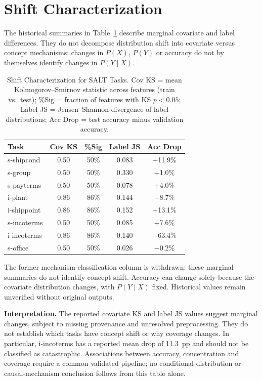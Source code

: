 \documentclass[accepted]{uai2026} %
\begin{document}
\section{Shift Characterization}\label{app:shift_characterization}

The historical summaries in Table~\ref{tab:shift_characterization} describe marginal covariate and label differences. They do not decompose distribution shift into covariate versus concept mechanisms: changes in $P(X)$, $P(Y)$ or accuracy do not by themselves identify changes in $P(Y\mid X)$.

\begin{table}[htbp]
\centering
\caption{Shift Characterization for SALT Tasks. Cov KS = mean Kolmogorov--Smirnov statistic across features (train vs.\ test); \%Sig = fraction of features with KS $p < 0.05$; Label JS = Jensen--Shannon divergence of label distributions; Acc Drop = test accuracy minus validation accuracy.}\label{tab:shift_characterization}
\small
\begin{tabular}{@{}lcccc@{}}
\toprule
Task & Cov KS & \%Sig & Label JS & Acc Drop \\
\midrule
s-shipcond & 0.50 & 50\% & 0.083 & +11.9\% \\
s-group & 0.50 & 50\% & 0.330 & +1.0\% \\
s-payterms & 0.50 & 50\% & 0.078 & +4.0\% \\
i-plant & 0.86 & 86\% & 0.144 & $-$8.7\% \\
i-shippoint & 0.86 & 86\% & 0.152 & +13.1\% \\
s-incoterms & 0.50 & 50\% & 0.085 & +7.6\% \\
i-incoterms & 0.86 & 86\% & 0.140 & +63.4\% \\
s-office & 0.50 & 50\% & 0.026 & $-$0.2\% \\
\bottomrule
\end{tabular}


\raggedright
\footnotesize
The former mechanism-classification column is withdrawn: these marginal summaries do not identify concept shift. Accuracy can change solely because the covariate distribution changes, with $P(Y\mid X)$ fixed. Historical values remain unverified without original outputs.
\end{table}

\textbf{Interpretation.} The reported covariate KS and label JS values suggest marginal changes, subject to missing provenance and unresolved preprocessing. They do not establish which tasks have concept shift or why coverage changes. In particular, i-incoterms has a reported mean drop of 11.3~pp and should not be classified as catastrophic. Associations between accuracy, concentration and coverage require a common validated pipeline; no conditional-distribution or causal-mechanism conclusion follows from this table alone.
\end{document}

